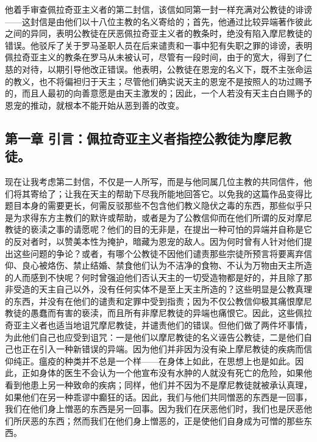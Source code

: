 他着手审查佩拉奇亚主义者的第二封信，该信如同第一封一样充满对公教徒的诽谤——这封信是由他们以十八位主教的名义寄给的；首先，他通过比较异端著作彼此之间的异同，表明公教徒在厌恶佩拉奇亚主义者的教条时，绝没有陷入摩尼教徒的错误。他驳斥了关于罗马圣职人员在后来谴责和一事中犯有失职之罪的诽谤，表明佩拉奇亚主义的教条在罗马从未被认可，尽管有一段时间，由于的宽大，得到了仁慈的对待，以期引导他改正错误。他表明，公教徒在恩宠的名义下，既不主张命运的教义，也不将偏袒归于天主；尽管他们确实说天主的恩宠不是按照人的功过赐予的，而且人最初的向善意愿是由天主激发的；因此，一个人若没有天主白白赐予的恩宠的推动，就根本不能开始从恶到善的改变。\par


\subsection{第一章 引言：佩拉奇亚主义者指控公教徒为摩尼教徒。}

现在让我考虑第二封信，不仅是一人所写，而是与他同属几位主教的共同信件，他们将其寄给了；让我在天主的帮助下尽我所能地回答它。以免我的这篇作品变得比题目本身的需要更长，何需反驳那些不包含他们教义隐伏之毒的东西，那些似乎只是为求得东方主教们的默许或帮助，或者是为了公教信仰而在他们所谓的反对摩尼教徒的亵渎之事的请愿呢？他们的目的无非是，在提出一种可怕的异端并自称是它的反对者时，以赞美本性为掩护，暗藏为恩宠的敌人。因为何时曾有人针对他们提出这些问题的争论？或者，有哪个公教徒不因他们谴责那些宗徒所预言将要离弃信仰、良心被烙伤、禁止结婚、禁食他们认为不洁净的食物、不认为万物由天主所造的人而感到不快呢？何时曾强迫他们否认天主的一切受造物都是好的，并且除了那非受造的天主自己以外，没有任何实体不是至上天主所造的？这些明显是公教真理的东西，并没有在他们的谴责和定罪中受到指责；因为不仅公教信仰极其痛恨摩尼教徒的愚蠢而有害的亵渎，而且所有非摩尼教徒的异端也痛恨它。因此，这些佩拉奇亚主义者也适当地诅咒摩尼教徒，并谴责他们的错误。但他们做了两件坏事情，为此他们自己也应受到诅咒：一是他们以摩尼教徒的名义诬告公教徒，二是他们自己也正在引入一种新错误的异端。因为他们并非因为没有染上摩尼教徒的疾病而信仰纯正。瘟疫的种类并不总是一个样——在身体上如此，在思想上也是如此。因此，正如身体的医生不会认为一个他宣布没有水肿的人就没有死亡的危险，如果他看到他患上另一种致命的疾病；同样，他们并不因为不是摩尼教徒就被承认真理，如果他们在另一种乖谬中癫狂的话。因此，我们与他们共同憎恶的东西是一回事，我们在他们身上憎恶的东西是另一回事。因为我们在厌恶他们时，我们也是厌恶他们所厌恶的东西；然而我们在他们身上憎恶的，正是使他们自身成为可憎的那些东西。\par

